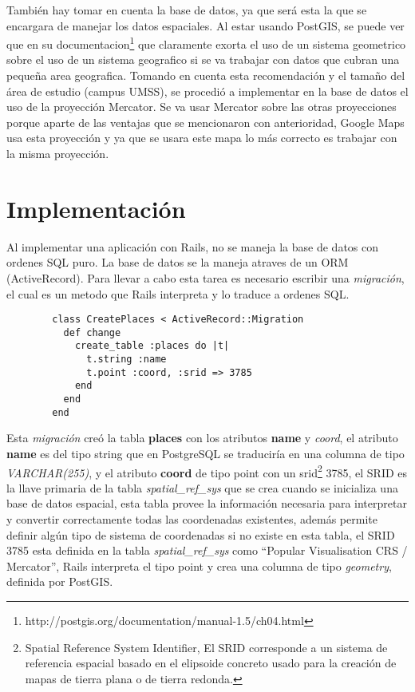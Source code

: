         También hay tomar en cuenta la base de datos, ya que será esta la que se encargara de manejar los datos espaciales. Al estar usando PostGIS, se puede ver que en su documentacion\footnote{ http://postgis.org/documentation/manual-1.5/ch04.html} que claramente exorta el uso de un sistema geometrico sobre el uso de un sistema geografico si  se va trabajar con datos que cubran una peque\~na area geografica. Tomando en cuenta esta recomendaci\'on y el tama\~no del área de estudio (campus UMSS), se procedió a implementar en la base de datos el uso de la proyecci\'on Mercator. Se va usar Mercator sobre las otras proyecciones porque aparte de las ventajas que se mencionaron con anterioridad, Google Maps usa esta proyecci\'on y ya que se usara este mapa lo más correcto es trabajar con la misma proyecci\'on.  
       



  \section{Implementaci\'on} %
  \label{sec:Implementacion}
    Al implementar una aplicaci\'on con Rails, no se maneja la base de datos con ordenes SQL  puro. La base de datos se la maneja atraves de un ORM (ActiveRecord). 
    Para llevar a cabo esta tarea es necesario escribir una \emph{migraci\'on}, el cual es un metodo que Rails interpreta y lo traduce a ordenes SQL.\\
    \begin{center}
      \begin{verbatim}
        class CreatePlaces < ActiveRecord::Migration
          def change
            create_table :places do |t|
              t.string :name
              t.point :coord, :srid => 3785 
            end
          end
        end
      \end{verbatim}
    \end{center}
    Esta \emph{migraci\'on} cre\'o la tabla \textbf{places} con los atributos \textbf{name} y \emph{coord}, el atributo \textbf{name} es del tipo string que en PostgreSQL se traducir\'ia en una columna de tipo \emph{VARCHAR(255)}, y el atributo \textbf{coord} de tipo point con un srid\footnote{ Spatial Reference System Identifier, El SRID corresponde a un sistema de referencia espacial basado en el elipsoide concreto usado para la creación de mapas de tierra plana o de tierra redonda.\cite{msdn_srid} } 3785,     el SRID  es la llave primaria de la tabla \emph{spatial\_ref\_sys} que se crea cuando se inicializa una base de datos espacial, esta tabla provee la informaci\'on necesaria para interpretar y convertir correctamente todas las coordenadas existentes, adem\'as permite definir alg\'un tipo de sistema de coordenadas si no existe en esta tabla, el SRID 3785 esta definida en la tabla \emph{spatial\_ref\_sys}  como ``Popular Visualisation CRS / Mercator'', Rails interpreta el tipo point y crea una columna de tipo \emph{geometry}, definida por PostGIS.\\

